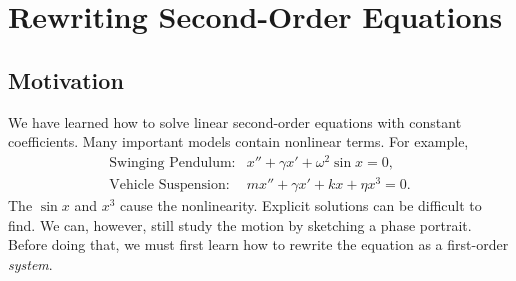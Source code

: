 \documentclass[10pt,letterpaper]{article}
\begin{document}


\section{Rewriting Second-Order Equations}

\subsection{Motivation}
We have learned how to solve linear second-order equations with constant coefficients. Many important models contain nonlinear terms. For example,
\[
\begin{array}{ll}
\text{Swinging Pendulum:} & x''+\gamma x'+\omega^2\sin x=0,\\[2pt]
\text{Vehicle Suspension:} & mx''+\gamma x'+kx+\eta x^3=0.
\end{array}
\]
The $\sin x$ and $x^3$ cause the nonlinearity. Explicit solutions can be difficult to find. We can, however, still study the motion by sketching a phase portrait. 
Before doing that, we must first learn how to rewrite the equation as a first-order \textit{system}.

\end{document}
